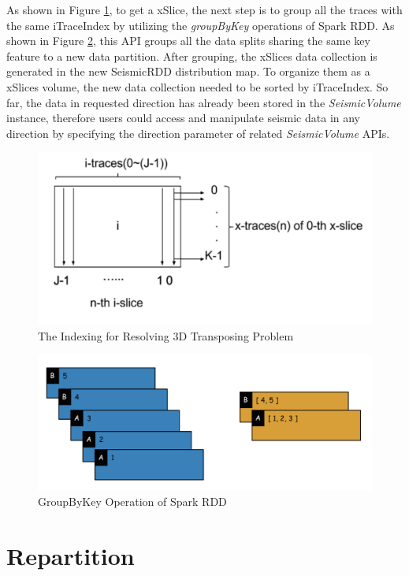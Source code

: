 As shown in Figure \ref{VolumeTrans}, to get a xSlice, the next step is to group all the traces with the same iTraceIndex by utilizing the \emph{groupByKey} operations of Spark RDD. As shown in Figure \ref{RDDGroup}, this API groups all the data splits sharing the same key feature to a new data partition. After grouping, the xSlices data collection is generated in the new SeismicRDD distribution map. To organize them as a xSlices volume, the new data collection needed to be sorted by iTraceIndex. So far, the data in requested direction has already been stored in the \emph{SeismicVolume} instance, therefore users could access and manipulate seismic data in any direction by specifying the direction parameter of related \emph{SeismicVolume} APIs.

\begin{figure}[h]
\centering
\includegraphics[scale=0.6]{figures/VolumeTrans.png}
\caption{The Indexing for Resolving 3D Transposing Problem}
\label{VolumeTrans}
\end{figure}

\begin{figure}[h]
\centering
\includegraphics[scale=0.4]{figures/RDDGroup.png}
\caption{GroupByKey Operation of Spark RDD}
\label{RDDGroup}
\end{figure}


\section{Repartition}

